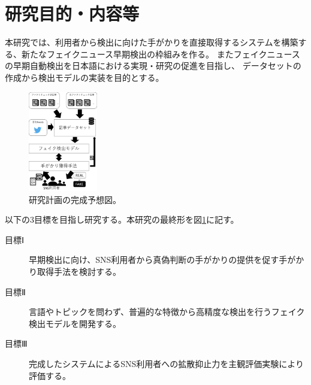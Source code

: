
\section{研究目的・内容等}

\vspace{20pt}
本研究では、利用者から検出に向けた手がかりを直接取得するシステムを構築する、新たなフェイクニュース早期検出の枠組みを作る。
またフェイクニュースの早期自動検出を日本語における実現・研究の促進を目指し、
データセットの作成から検出モデルの実装を目的とする。


\setlength\intextsep{0pt}
\setlength\textfloatsep{0pt}
\begin{figure}
    \vspace{-2\baselineskip}
    \centering
    \includegraphics[width=0.27\textwidth]{figs/final.pdf}
    \vspace{-1cm} 
    \caption{研究計画の完成予想図。}
    \label{fig:dataset}
    \vspace{-3\baselineskip}
\end{figure}

以下の3目標を目指し研究する。本研究の最終形を図\ref{fig:dataset}に記す。
\begin{description}
    \item[目標Ⅰ] 早期検出に向け、SNS利用者から真偽判断の手がかりの提供を促す手がかり取得手法を検討する。
    \item[目標Ⅱ] 言語やトピックを問わず、普遍的な特徴から高精度な検出を行うフェイク検出モデルを開発する。
    \item[目標Ⅲ] 完成したシステムによるSNS利用者への拡散抑止力を主観評価実験により評価する。
\end{description}

